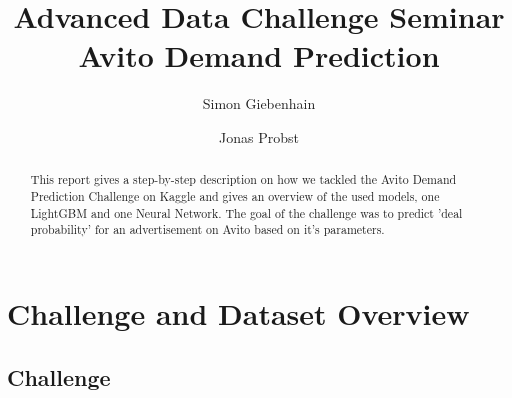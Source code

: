 \documentclass[runningheads]{llncs}
\begin{document}
%
\title{Advanced Data Challenge Seminar\\
		Avito Demand Prediction}
%

%
\author{Simon Giebenhain \and Jonas Probst}
%

%
%
\maketitle              %
%
\begin{abstract}
This report gives a step-by-step description on how we tackled the Avito Demand Prediction Challenge on Kaggle and gives an overview of the used models, one LightGBM and one Neural Network. The goal of the challenge was to predict 'deal probability' for an advertisement on Avito based on it's parameters. 

\end{abstract}
%
%
%
	\section{Challenge and Dataset Overview}
\subsection{Challenge}
\end{document}
